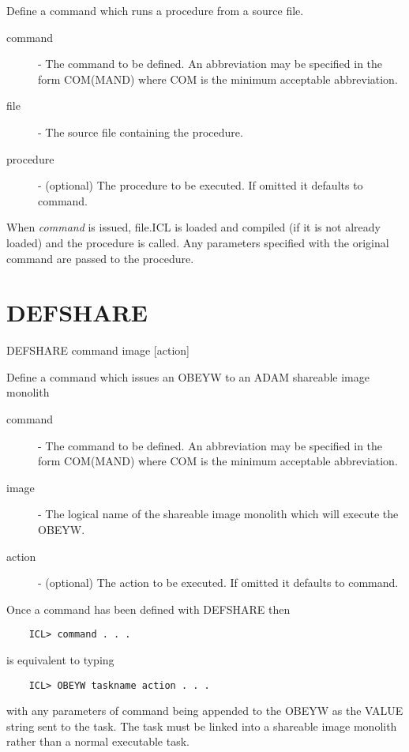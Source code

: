 \documentclass[twoside,11pt]{report}
\newcommand{\xlabel}[1]{}
\begin{document}
 Define a command which runs a procedure from a source file.

\begin{description}

\item[command] - The command to be defined. An abbreviation
              may be specified in the form COM(MAND) where
              COM is the minimum acceptable abbreviation.

\item[file]  - The source file containing the procedure.

\item[procedure] - (optional)  The procedure to be executed. If
              omitted it defaults to command.

\end{description}

When {\em command} is issued, file.ICL is loaded and compiled (if it is
not already loaded) and the procedure is called. Any parameters specified
with the original command are passed to the procedure.

\section{\xlabel{DEFSHARE}DEFSHARE\label{DEFSHARE}}

   DEFSHARE \hspace{.5cm} command \hspace{.5cm} image \hspace{.5cm} [action]

 Define a command which issues an OBEYW to an ADAM shareable image monolith

\begin{description}

\item[command] - The command to be defined. An abbreviation
              may be specified in the form COM(MAND) where
              COM is the minimum acceptable abbreviation.

\item[image] - The logical name of the shareable image monolith
               which will execute the OBEYW.

\item[action] - (optional)  The action to be executed. If
              omitted it defaults to command.

\end{description}
Once a command has been defined with DEFSHARE then
\begin{verbatim}
    ICL> command . . .
\end{verbatim}
is equivalent to typing 
\begin{verbatim}
    ICL> OBEYW taskname action . . .
\end{verbatim}
with any parameters of command being appended to the OBEYW as the VALUE
string sent to the task. The task must be linked into a shareable image
monolith rather than a normal executable task.
\end{document}
